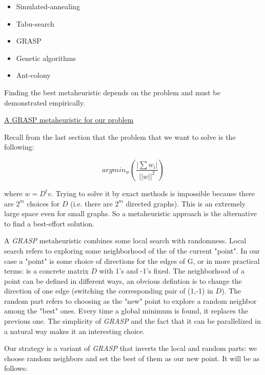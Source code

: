 \documentclass[a4paper,11pt]{article}
\begin{document}
\begin{itemize}
	\item Simulated-annealing
	\item Tabu-search
	\item GRASP
	\item Genetic algorithms
	\item Ant-colony
\end{itemize}

Finding the best metaheuristic depends on the problem and must be 
demonstrated empirically.

\bigskip

\underline{A GRASP metaheuristic for our problem}

\bigskip

Recall from the last section that the problem that we want to solve is 
the following:

$$argmin_w(\frac{|\sum w_i|}{||w||^2})$$

where $w = D^t v$. Trying to solve it by exact methods is impossible 
because there are $2^m$ choices for $D$ (i.e. there are $2^m$ directed 
graphs). This is an extremely large space even for small graphs. So a 
metaheuristic approach is the alternative to find a best-effort solution.

\bigskip

A \textit{GRASP} metaheuristic combines some local search 
with randomness. Local search refers to exploring some neighborhood of 
the of the current "point". In our case a "point" is some choice of 
directions for the edges of G, or in more practical terms: is a 
concrete matrix $D$ with 1's and -1's fixed. The neighborhood of a 
point can be defined in different ways, an obvious defintion is to 
change the direction of one edge (switching the corresponding pair of 
(1,-1) in $D$). The random part refers to choosing as the "new" point to 
explore a random neighbor among the "best" ones. Every time a global 
minimum is found, it replaces the previous one. The simplicity of 
\textit{GRASP} and the fact that it can be parallelized in a natural 
way makes it an interesting choice.

\bigskip

Our strategy is a variant of \textit{GRASP} that inverts the local and 
random parts: we choose random neighbors and set the best of them as 
our new point. It will be as follows:
\end{document}

